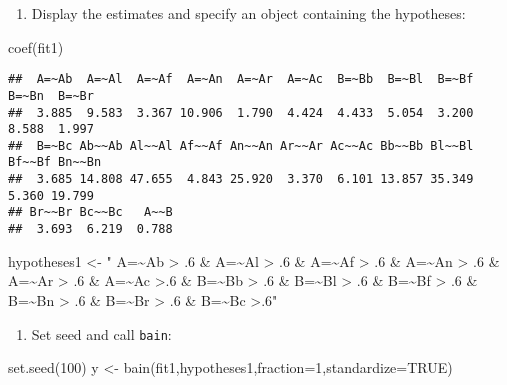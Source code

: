 \documentclass[
]{book}
\newenvironment{Shaded}{\begin{snugshade}}{\end{snugshade}}
\newcommand{\AttributeTok}[1]{\textcolor[rgb]{0.77,0.63,0.00}{#1}}
\newcommand{\ConstantTok}[1]{\textcolor[rgb]{0.00,0.00,0.00}{#1}}
\newcommand{\DecValTok}[1]{\textcolor[rgb]{0.00,0.00,0.81}{#1}}
\newcommand{\FunctionTok}[1]{\textcolor[rgb]{0.00,0.00,0.00}{#1}}
\newcommand{\NormalTok}[1]{#1}
\newcommand{\OtherTok}[1]{\textcolor[rgb]{0.56,0.35,0.01}{#1}}
\newcommand{\StringTok}[1]{\textcolor[rgb]{0.31,0.60,0.02}{#1}}
\providecommand{\tightlist}{%
  \setlength{\itemsep}{0pt}\setlength{\parskip}{0pt}}
\begin{document}
\begin{enumerate}
\def\labelenumi{\arabic{enumi})}
\setcounter{enumi}{1}
\tightlist
\item
  Display the estimates and specify an object containing the hypotheses:
\end{enumerate}

\begin{Shaded}
\begin{Highlighting}[]
\FunctionTok{coef}\NormalTok{(fit1)}
\end{Highlighting}
\end{Shaded}

\begin{verbatim}
##  A=~Ab  A=~Al  A=~Af  A=~An  A=~Ar  A=~Ac  B=~Bb  B=~Bl  B=~Bf  B=~Bn  B=~Br 
##  3.885  9.583  3.367 10.906  1.790  4.424  4.433  5.054  3.200  8.588  1.997 
##  B=~Bc Ab~~Ab Al~~Al Af~~Af An~~An Ar~~Ar Ac~~Ac Bb~~Bb Bl~~Bl Bf~~Bf Bn~~Bn 
##  3.685 14.808 47.655  4.843 25.920  3.370  6.101 13.857 35.349  5.360 19.799 
## Br~~Br Bc~~Bc   A~~B 
##  3.693  6.219  0.788
\end{verbatim}

\begin{Shaded}
\begin{Highlighting}[]
\NormalTok{hypotheses1 }\OtherTok{\textless{}{-}}
\StringTok{" A=\textasciitilde{}Ab \textgreater{} .6 \& A=\textasciitilde{}Al \textgreater{} .6 \& A=\textasciitilde{}Af \textgreater{} .6 \& A=\textasciitilde{}An \textgreater{} .6 \& A=\textasciitilde{}Ar \textgreater{} .6 \& A=\textasciitilde{}Ac \textgreater{}.6 \& }
\StringTok{B=\textasciitilde{}Bb \textgreater{} .6 \& B=\textasciitilde{}Bl \textgreater{} .6 \& B=\textasciitilde{}Bf \textgreater{} .6 \& B=\textasciitilde{}Bn \textgreater{} .6 \& B=\textasciitilde{}Br \textgreater{} .6 \& B=\textasciitilde{}Bc \textgreater{}.6"}
\end{Highlighting}
\end{Shaded}

\begin{enumerate}
\def\labelenumi{\arabic{enumi})}
\setcounter{enumi}{2}
\tightlist
\item
  Set seed and call \texttt{bain}:
\end{enumerate}

\begin{Shaded}
\begin{Highlighting}[]
\FunctionTok{set.seed}\NormalTok{(}\DecValTok{100}\NormalTok{)}
\NormalTok{y }\OtherTok{\textless{}{-}} \FunctionTok{bain}\NormalTok{(fit1,hypotheses1,}\AttributeTok{fraction=}\DecValTok{1}\NormalTok{,}\AttributeTok{standardize=}\ConstantTok{TRUE}\NormalTok{)}
\end{Highlighting}
\end{Shaded}
\end{document}
